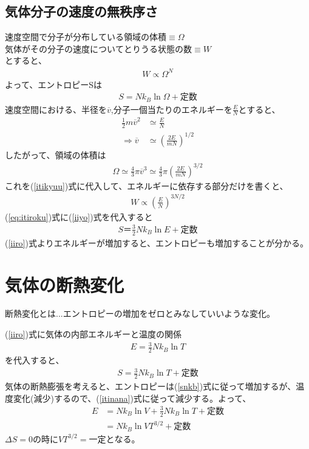 \subsection{気体分子の速度の無秩序さ}
$速度空間で分子が分布している領域の体積\equiv \Omega$\\
$気体がその分子の速度についてとりうる状態の数\equiv W$\\
とすると、
\begin{align}
  W\propto \Omega^N   \label{itikyuu}
\end{align}
よって、エントロピーSは
\begin{align}
  S= N k_B \ln{\Omega}+定数
\end{align}
速度空間における、半径を$\overline{v}$,分子一個当たりのエネルギーを$\frac{E}{N}$とすると、
\begin{align}
  \frac{1}{2}m\overline{v}^2 &\simeq \frac{E}{N}\\
  \Rightarrow \overline{v} &\simeq \left(\frac{2E}{mN}\right)^{1/2}
\end{align}
したがって、領域の体積は
\begin{align}
  \Omega \simeq \frac{4}{3}\pi \overline{v}^3 \simeq \frac{4}{3}\pi \left(\frac{2E}{mN}\right)^{3/2}  \label{iisa}
\end{align}
これを(\ref{itikyuu})式に代入して、エネルギーに依存する部分だけを書くと、
\begin{align}
  W\propto \left(\frac{E}{N}\right)^{3N/2}   \label{iiyo}
\end{align}
(\ref{eq:itiroku})式に(\ref{iiyo})式を代入すると
\begin{align}
  S＝\frac{3}{2}N k_B \ln{E}+定数   \label{iiro}
\end{align}
(\ref{iiro})式よりエネルギーが増加すると、エントロピーも増加することが分かる。
\section{気体の断熱変化}
断熱変化とは...エントロピーの増加をゼロとみなしていいような変化。\par
(\ref{iiro})式に気体の内部エネルギーと温度の関係
\begin{align}
  E=\frac{3}{2}N k_B \ln{T}
\end{align}
を代入すると、
\begin{align}
  S=\frac{3}{2}N k_B \ln{T} +定数   \label{itinana}
\end{align}
気体の断熱膨張を考えると、エントロピーは(\ref{snkb})式に従って増加するが、温度変化(減少)するので、(\ref{itinana})式に従って減少する。よって、
\begin{align}
  E&=Nk_B\ln{V}+\frac{3}{2}N k_B \ln{T}+定数\\
    &=Nk_B\ln VT^{3/2}+ 定数   \label{iiku}
\end{align}
$\Delta S=0の時にVT^{3/2}=一定となる。$

